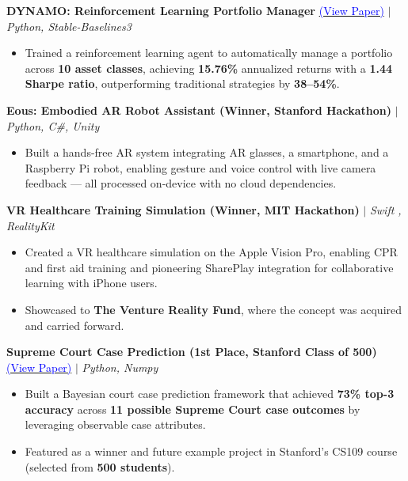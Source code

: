 \documentclass[10pt, letterpaper]{article}
\begin{document}
\smallskip

\textbf{DYNAMO: Reinforcement Learning Portfolio Manager}
\href{https://feolukolawole.com/Dynamo.pdf}{{\textcolor{blue}{(View Paper)}}}
$|$ \textit{Python, Stable-Baselines3}
\begin{itemize}[leftmargin=1.5em, topsep=2pt, itemsep=1pt, parsep=0pt]
  \item Trained a reinforcement learning agent to automatically manage a portfolio across \textbf{10 asset classes},
  achieving \textbf{15.76\%} annualized returns with a \textbf{1.44 Sharpe ratio}, outperforming traditional strategies by \textbf{38--54\%}.
\end{itemize}

\smallskip

\textbf{Eous: Embodied AR Robot Assistant (Winner, Stanford Hackathon)} $|$ \textit{Python, C\#, Unity}
\begin{itemize}[leftmargin=1.5em, topsep=2pt, itemsep=1pt, parsep=0pt]
  \item Built a hands-free AR system integrating AR glasses, a smartphone, and a Raspberry Pi robot,
  enabling gesture and voice control with live camera feedback — all processed on-device with no cloud dependencies.
\end{itemize}

\smallskip

\textbf{VR Healthcare Training Simulation (Winner, MIT Hackathon)} $|$ \textit{Swift , RealityKit}
\begin{itemize}[leftmargin=1.5em, topsep=2pt, itemsep=1pt, parsep=0pt]
  \item Created a VR healthcare simulation on the Apple Vision Pro, enabling CPR and first aid training and
  pioneering SharePlay integration for collaborative learning with iPhone users.
  \item Showcased to \textbf{The Venture Reality Fund}, where the concept was acquired and carried forward.
\end{itemize}

\smallskip

\textbf{Supreme Court Case Prediction (1st Place, Stanford Class of 500)}
\href{https://feolukolawole.com/Court_Justice_Prediction.pdf}{{\textcolor{blue}{(View Paper)}}}
$|$ \textit{Python, Numpy}
\begin{itemize}[leftmargin=1.5em, topsep=2pt, itemsep=1pt, parsep=0pt]
  \item Built a Bayesian court case prediction framework that achieved \textbf{73\% top-3 accuracy} across \textbf{11 possible
  Supreme Court case outcomes} by leveraging observable case attributes.
  \item Featured as a winner and future example project in Stanford's CS109 course (selected from \textbf{500 students}).
\end{itemize}
\end{document}
